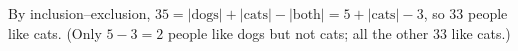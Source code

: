 By inclusion--exclusion, $35=|\text{dogs}|+|\text{cats}|-|\text{both}|=5+|\text{cats}|-3$, so $\boxed{33}$ people like cats. (Only $5-3=2$ people like dogs but not cats; all the other $33$ like cats.)
